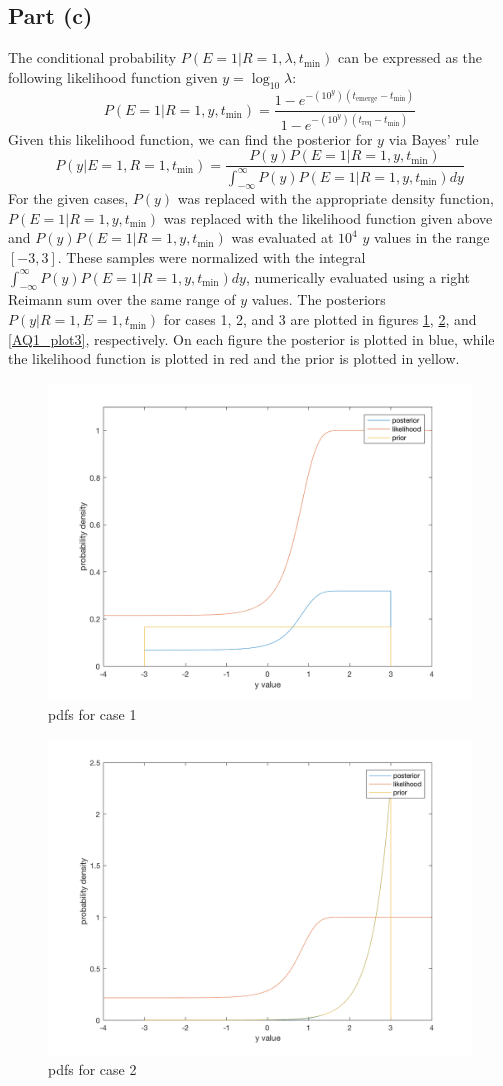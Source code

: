 \documentclass[11pt]{article}
\begin{document}
\subsection*{Part (c)}
The conditional probability $P(E=1|R=1,\lambda,t_\text{min})$ can be expressed as the following likelihood function given $y=\log_{10}\lambda$:
\begin{equation*}
	P(E=1|R=1,y,t_\text{min})=\frac{1-e^{-(10^y)(t_\text{emerge}-t_\text{min})}}{1-e^{-(10^y)(t_\text{req}-t_\text{min})}}
\end{equation*}
Given this likelihood function, we can find the posterior for $y$ via Bayes' rule
\begin{equation*}
	P(y|E=1,R=1,t_\text{min}) = \frac{P(y)P(E=1|R=1,y,t_\text{min})}{\int_{-\infty}^\infty P(y)P(E=1|R=1,y,t_\text{min})dy}
\end{equation*}
For the given cases, $P(y)$ was replaced with the appropriate density function, $P(E=1|R=1,y,t_\text{min})$ was replaced with the likelihood function given above and $P(y)P(E=1|R=1,y,t_\text{min})$ was evaluated at $10^4$ $y$ values in the range $[-3,3]$. These samples were normalized with the integral $\int_{-\infty}^\infty P(y)P(E=1|R=1,y,t_\text{min})dy$, numerically evaluated using a right Reimann sum over the same range of $y$ values. The posteriors $P(y|R=1,E=1,t_\text{min})$ for cases 1, 2, and 3 are plotted in figures \ref{AQ1_plot1}, \ref{AQ1_plot2}, and \ref{AQ1_plot3}, respectively. On each figure the posterior is plotted in blue, while the likelihood function is plotted in red and the prior is plotted in yellow.
\begin{figure}[h!]
	\centering
	\includegraphics[width=0.6\linewidth]{AQ1_plot1.png}
	\caption{pdfs for case 1}
	\label{AQ1_plot1}
\end{figure}
\begin{figure}[h!]
	\centering
	\includegraphics[width=0.6\linewidth]{AQ1_plot2.png}
	\caption{pdfs for case 2}
	\label{AQ1_plot2}
\end{figure}
\end{document}
